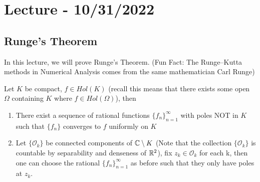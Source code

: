 \documentclass{article}
\begin{document}


\section{Lecture - 10/31/2022}

\subsection{Runge's Theorem}

In this lecture, we will prove Runge's Theorem. (Fun Fact: The Runge–Kutta methods in Numerical Analysis comes from the same mathematician Carl Runge)

\begin{theorem}
    Let $K$ be compact, $f \in Hol(K)$ (recall this means that there exists some open $\Omega$ containing $K$ where $f \in Hol(\Omega)$), then
    \begin{enumerate}
        \item There exist a sequence of rational functions $\{f_n\}_{n = 1}^\infty$ with poles NOT in $K$ such that $\{f_n\}$ converges to $f$ uniformly on $K$
        \item Let $\{\mathcal{O}_k\}$ be connected components of $\mathbb{C} \setminus K$ (Note that the collection $\{\mathcal{O}_k\}$ is countable by separability and denseness of $\mathbb{R}^2$), fix $z_k \in \mathcal{O}_k$ for each k, then one can choose the rational $\{f_n\}_{n = 1}^\infty$ as before such that they only have poles at $z_k$.
    \end{enumerate}
\end{theorem}
\end{document}
